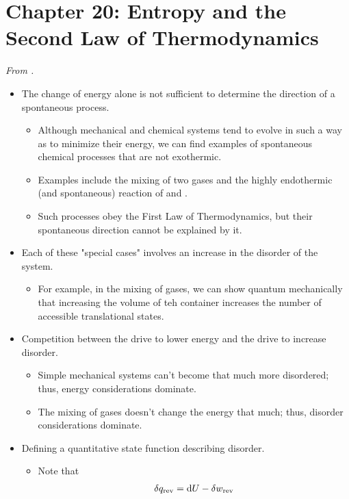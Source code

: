 \documentclass[../notes.tex]{subfiles}
\begin{document}
\section{Chapter 20: Entropy and the Second Law of Thermodynamics}
\emph{From \textcite{bib:McQuarrieSimon}.}
\begin{itemize}
    \item {}The change of energy alone is not sufficient to determine the direction of a spontaneous process.
    \begin{itemize}
        \item Although mechanical and chemical systems tend to evolve in such a way as to minimize their energy, we can find examples of spontaneous chemical processes that are not exothermic.
        \item Examples include the mixing of two gases and the highly endothermic (and spontaneous) reaction of  and .
        \item Such processes obey the First Law of Thermodynamics, but their spontaneous direction cannot be explained by it.
    \end{itemize}
    \item Each of these "special cases" involves an increase in the disorder of the system.
    \begin{itemize}
        \item For example, in the mixing of gases, we can show quantum mechanically that increasing the volume of teh container increases the number of accessible translational states.
    \end{itemize}
    \item Competition between the drive to lower energy and the drive to increase disorder.
    \begin{itemize}
        \item Simple mechanical systems can't become that much more disordered; thus, energy considerations dominate.
        \item The mixing of gases doesn't change the energy that much; thus, disorder considerations dominate.
    \end{itemize}
    \item Defining a quantitative state function describing disorder.
    \begin{itemize}
        \item Note that
        \begin{align*}
            \var{q_\text{rev}} &= \dd{U}-\var{w_\text{rev}}\\

\end{align*}
\end{itemize}
\end{itemize}
\end{document}
